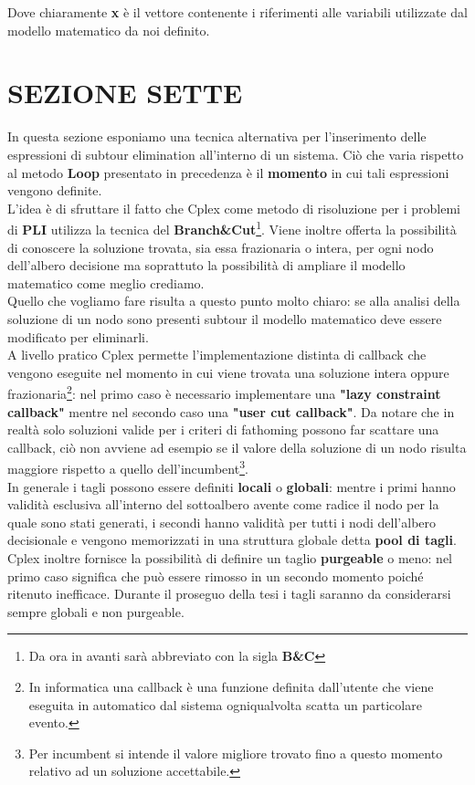 \documentclass[11pt]{article}
\begin{document}
Dove chiaramente \textbf{x} è il vettore contenente i riferimenti alle variabili utilizzate dal modello matematico da noi definito.

\section*{SEZIONE SETTE}
\label{sec:SezioneSetteS}

In questa sezione esponiamo una tecnica alternativa per l'inserimento delle espressioni di subtour elimination all'interno di un sistema. Ciò che varia rispetto al metodo \textbf{Loop} presentato in precedenza è il \textbf{momento} in cui tali espressioni vengono definite.\\
L'idea è di sfruttare il fatto che Cplex come metodo di risoluzione per i problemi di \textbf{PLI} utilizza la tecnica del \textbf{Branch\&Cut}\footnote{Da ora in avanti sarà abbreviato con la sigla \textbf{B\&C}}. Viene inoltre offerta la possibilità di conoscere la soluzione trovata, sia essa frazionaria o intera, per ogni nodo dell'albero decisione ma soprattuto la possibilità di ampliare il modello matematico come meglio crediamo.\\
Quello che vogliamo fare risulta a questo punto molto chiaro: se alla analisi della soluzione di un nodo sono presenti subtour il modello matematico deve essere modificato per eliminarli.\\
A livello pratico Cplex permette l'implementazione distinta di callback che vengono eseguite nel momento in cui viene trovata una soluzione intera oppure frazionaria\footnote{In informatica una callback è una funzione definita dall'utente che viene eseguita in automatico dal sistema ogniqualvolta scatta un particolare evento.}: nel primo caso è necessario implementare una \textbf{"lazy constraint callback"} mentre nel secondo caso una \textbf{"user cut callback"}. Da notare che in realtà solo soluzioni valide per i criteri di fathoming possono far scattare una callback, ciò non avviene ad esempio se il valore della soluzione di un nodo risulta maggiore rispetto a quello dell'incumbent\footnote{Per incumbent si intende il valore migliore trovato fino a questo momento relativo ad un soluzione accettabile.}.\\
In generale i tagli possono essere definiti \textbf{locali} o \textbf{globali}: mentre i primi hanno validità esclusiva all'interno del sottoalbero avente come radice il nodo per la quale sono stati generati, i secondi hanno validità per tutti i nodi dell'albero decisionale e vengono memorizzati in una struttura globale detta \textbf{pool di tagli}. Cplex inoltre fornisce la possibilità di definire un taglio \textbf{purgeable} o meno: nel primo caso significa che può essere rimosso in un secondo momento poiché ritenuto inefficace. Durante il proseguo della tesi i tagli saranno da considerarsi sempre globali e non purgeable.
\end{document}
